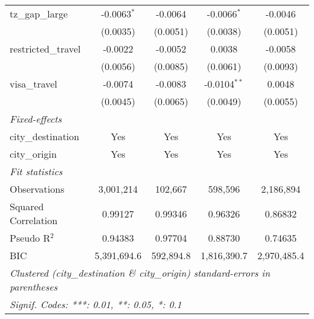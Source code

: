 \begin{tabular}{lcccc}
   tz\_gap\_large                    & -0.0063$^{*}$  & -0.0064        & -0.0066$^{*}$  & -0.0046\\   
                                     & (0.0035)       & (0.0051)       & (0.0038)       & (0.0051)\\   
   restricted\_travel                & -0.0022        & -0.0052        & 0.0038         & -0.0058\\   
                                     & (0.0056)       & (0.0085)       & (0.0061)       & (0.0093)\\   
   visa\_travel                      & -0.0074        & -0.0083        & -0.0104$^{**}$ & 0.0048\\   
                                     & (0.0045)       & (0.0065)       & (0.0049)       & (0.0055)\\   
   \midrule
   \emph{Fixed-effects}\\
   city\_destination                 & Yes            & Yes            & Yes            & Yes\\  
   city\_origin                      & Yes            & Yes            & Yes            & Yes\\  
   \midrule
   \emph{Fit statistics}\\
   Observations                      & 3,001,214      & 102,667        & 598,596        & 2,186,894\\  
   Squared Correlation               & 0.99127        & 0.99346        & 0.96326        & 0.86832\\  
   Pseudo R$^2$                      & 0.94383        & 0.97704        & 0.88730        & 0.74635\\  
   BIC                               & 5,391,694.6    & 592,894.8      & 1,816,390.7    & 2,970,485.4\\  
   \midrule \midrule
   \multicolumn{5}{l}{\emph{Clustered (city\_destination \& city\_origin) standard-errors in parentheses}}\\
   \multicolumn{5}{l}{\emph{Signif. Codes: ***: 0.01, **: 0.05, *: 0.1}}\\
\end{tabular}
\par\endgroup



